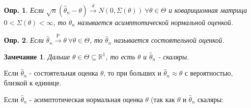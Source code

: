\documentclass[12pt]{article}
\newtheorem{definition}{Опр.}
\newtheorem{remark}{Замечание}
\theoremstyle{basic_theorem}
\theoremstyle{name_theorem}
\def\R{ \mathbb{R} }
\def\P{ \mathrm{P} }
\begin{document}
\begin{definition}
    Если \(\sqrt{n}(\widehat{\theta}_n - \theta) \xrightarrow{d} N(0, \Sigma(\theta)) \ \forall \theta \in \Theta\)
    и ковариционная матрица \(0 < \Sigma(\theta) < \infty\), то \(\widehat{\theta}_n\) называется асимптотической нормальной оценкой.
\end{definition}

\begin{definition}
    Если \(\widehat{\theta}_n \xrightarrow{\P} \theta \ \forall \theta \in \Theta\), то \(\widehat{\theta}_n\) называется состоятельной оценкой.
\end{definition}

\begin{remark}
    Дальше \(\theta \in \Theta \subseteq \R^1\), то есть \(\theta\) и \(\widehat{\theta}_n\) - скаляры.
\end{remark}

Если \(\widehat{\theta}_n\) - состоятельная оценка \(\theta\), то при больших и \(\widehat{\theta}_n \approx \theta\) с вероятностью, близкой к единице.

Если \(\widehat{\theta}_n\) - асимптотическая нормальная оценка \(\theta\) (так как \(\theta\) и \(\widehat{\theta}_n\) скаляры:
\end{document}

